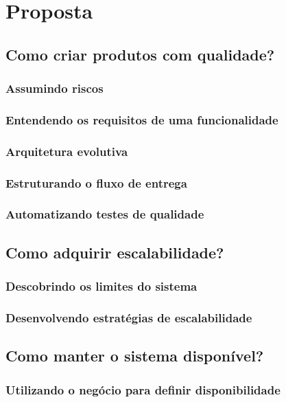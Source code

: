 \chapter{Proposta}

  \section{Como criar produtos com qualidade?}
    \subsection{Assumindo riscos}
    \subsection{Entendendo os requisitos de uma funcionalidade}
    \subsection{Arquitetura evolutiva}
    \subsection{Estruturando o fluxo de entrega}
    \subsection{Automatizando testes de qualidade}

  \section{Como adquirir escalabilidade?}
    \subsection{Descobrindo os limites do sistema}
    \subsection{Desenvolvendo estratégias de escalabilidade}

  \section{Como manter o sistema disponível?}
    \subsection{Utilizando o negócio para definir disponibilidade}
